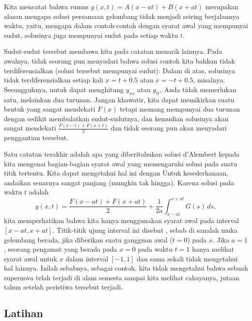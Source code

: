Kita mencatat bahwa rumus $y(x,t) = A(x-at) + B(x+at)$ merupakan alasan
mengapa solusi persamaan gelombang tidak menjadi  seiring
berjalannya waktu, yaitu, mengapa dalam contoh-contoh dengan syarat awal
yang mempunyai sudut, solusinya juga mempunyai sudut pada setiap waktu $t$.

\medskip

Sudut-sudut tersebut membawa kita pada catatan menarik lainnya.  Pada awalnya, tidak seorang pun menyadari
bahwa solusi contoh kita bahkan tidak terdiferensialkan (solusi tersebut mempunyai sudut):
Dalam  di atas, solusinya tidak
terdiferensialkan setiap kali $x=t+0.5$ atau $x=-t+0.5$, misalnya.
Sesungguhnya, untuk dapat menghitung $y_{xx}$ atau $y_{tt}$, Anda tidak memerlukan satu, melainkan dua
turunan.  Jangan khawatir, kita dapat memikirkan suatu bentuk yang sangat mendekati
$F(x)$ tetapi memang mempunyai dua turunan dengan sedikit membulatkan sudut-sudutnya,
dan kemudian solusinya akan sangat mendekati
$\frac{F(x-t)+F(x+t)}{2}$ dan tidak seorang pun akan menyadari penggantian tersebut.

\medskip

Satu catatan terakhir adalah apa yang diberitahukan solusi d'Alembert kepada kita mengenai
bagian-bagian syarat awal yang memengaruhi solusi pada suatu titik tertentu.
Kita dapat mengetahui hal ini dengan   Untuk kesederhanaan, andaikan senarnya sangat panjang (mungkin
tak hingga).  Karena solusi pada waktu $t$ adalah
\begin{equation*}
y(x,t) =
\frac{F(x-at) + F(x+at)}{2} + \frac{1}{2a} \int_{x-at}^{x+at} G(s) \,ds ,
\end{equation*}
kita memperhatikan bahwa kita hanya menggunakan syarat awal pada interval
$[x-at,x+at]$.  Titik-titik ujung interval ini disebut
\emph{}, sebab di sanalah muka gelombang berada, jika diberikan
suatu gangguan awal ($t=0$) pada $x$.
Jika $a=1$, seorang pengamat yang berada pada $x=0$ pada waktu $t=1$ hanya melihat
syarat awal untuk $x$ dalam interval $[-1,1]$
dan sama sekali tidak mengetahui hal lainnya.
Inilah sebabnya, sebagai contoh, kita tidak mengetahui bahwa sebuah supernova telah terjadi di
alam semesta sampai kita melihat cahayanya, jutaan tahun setelah
peristiwa tersebut terjadi.

\subsection{Latihan}

